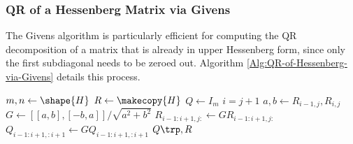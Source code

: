 \begin{comment}
\begin{info} %
Like Householder transformations, Givens rotations are orthonormal, and therefore numerically stable.
In addition, they affect only a small part of the array at each iteration, making them ideal for some problems.

In general, however, Algorithm \ref{Alg:QR-via-Givens} requires more floating point operations than Algorithm \ref{Alg:QR-via-Householder}.
On the other hand, the Givens algorithm can be \emph{parallelized}, meaning that multiple processors can be used to simultaneously carry out different iterations of the algorithm.
\end{info}
\end{comment}

\subsubsection*{QR of a Hessenberg Matrix via Givens} %

The Givens algorithm is particularly efficient for computing the QR decomposition of a matrix that is already in upper Hessenberg form, since only the first subdiagonal needs to be zeroed out.
Algorithm \ref{Alg:QR-of-Hessenberg-via-Givens} details this process.

\begin{algorithm}[H]
\begin{algorithmic}[1]
\State $m, n \gets \shape{H}$
\State $R \gets \makecopy{H}$
\State $Q \gets I_{m}$
    \State $i = j+1$
    \State $a, b \gets R_{i-1,j}, R_{i,j}$
    \State $G \gets [[a, b],[-b,a]]/\sqrt{a^2+b^2}$
    \State $R_{i-1:i+1,j:} \gets GR_{i-1:i+1, j:}$
    \State $Q_{i-1:i+1,:i+1} \gets GQ_{i-1:i+1,:i+1}$
\EndFor
\State {} $Q\trp , R$
\EndProcedure
\end{algorithmic}
\caption{}
\label{Alg:QR-of-Hessenberg-via-Givens}
\end{algorithm}
